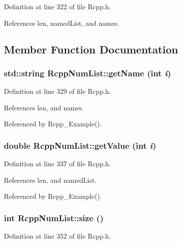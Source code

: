 Definition at line 322 of file Rcpp.h.

References len, namedList, and names.

\subsection{Member Function Documentation}
\hypertarget{classRcppNumList_a246d8e534d97fbe798b8567bbfa93ca7}{
\subsubsection[{getName}]{\setlength{\rightskip}{0pt plus 5cm}std::string RcppNumList::getName (int {\em i})}}
\label{classRcppNumList_a246d8e534d97fbe798b8567bbfa93ca7}


Definition at line 329 of file Rcpp.h.

References len, and names.

Referenced by Rcpp\_\-Example().\hypertarget{classRcppNumList_a2e83950933ddc73ad64ed800f6f5e23b}{
\subsubsection[{getValue}]{\setlength{\rightskip}{0pt plus 5cm}double RcppNumList::getValue (int {\em i})}}
\label{classRcppNumList_a2e83950933ddc73ad64ed800f6f5e23b}


Definition at line 337 of file Rcpp.h.

References len, and namedList.

Referenced by Rcpp\_\-Example().\hypertarget{classRcppNumList_a18dc0660cc827bcf17d9738cb5874db7}{
\subsubsection[{size}]{\setlength{\rightskip}{0pt plus 5cm}int RcppNumList::size ()}}
\label{classRcppNumList_a18dc0660cc827bcf17d9738cb5874db7}


Definition at line 352 of file Rcpp.h.

